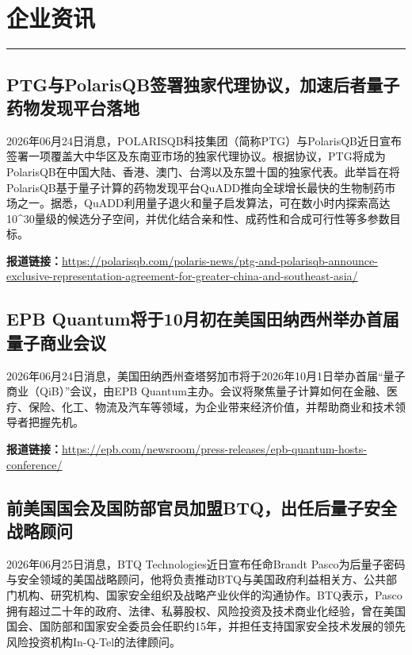 \documentclass[12pt,a4paper]{ctexart}
\begin{document}
\section{企业资讯}
\vspace{-0.5em}
\noindent\rule{\linewidth}{1.5pt}

\subsection{ PTG与PolarisQB签署独家代理协议，加速后者量子药物发现平台落地 }

2026年06月24日消息，POLARISQB科技集团（简称PTG）与PolarisQB近日宣布签署一项覆盖大中华区及东南亚市场的独家代理协议。根据协议，PTG将成为PolarisQB在中国大陆、香港、澳门、台湾以及东盟十国的独家代表。此举旨在将PolarisQB基于量子计算的药物发现平台QuADD推向全球增长最快的生物制药市场之一。据悉，QuADD利用量子退火和量子启发算法，可在数小时内探索高达10\textasciicircum{}30量级的候选分子空间，并优化结合亲和性、成药性和合成可行性等多参数目标。

\noindent\textbf{报道链接：}\url{https://polarisqb.com/polaris-news/ptg-and-polarisqb-announce-exclusive-representation-agreement-for-greater-china-and-southeast-asia/}

\subsection{ EPB Quantum将于10月初在美国田纳西州举办首届量子商业会议 }

2026年06月24日消息，美国田纳西州查塔努加市将于2026年10月1日举办首届“量子商业（QiB）”会议，由EPB Quantum主办。会议将聚焦量子计算如何在金融、医疗、保险、化工、物流及汽车等领域，为企业带来经济价值，并帮助商业和技术领导者把握先机。

\noindent\textbf{报道链接：}\url{https://epb.com/newsroom/press-releases/epb-quantum-hosts-conference/}

\subsection{ 前美国国会及国防部官员加盟BTQ，出任后量子安全战略顾问 }

2026年06月25日消息，BTQ Technologies近日宣布任命Brandt Pasco为后量子密码与安全领域的美国战略顾问，他将负责推动BTQ与美国政府利益相关方、公共部门机构、研究机构、国家安全组织及战略产业伙伴的沟通协作。BTQ表示，Pasco拥有超过二十年的政府、法律、私募股权、风险投资及技术商业化经验，曾在美国国会、国防部和国家安全委员会任职约15年，并担任支持国家安全技术发展的领先风险投资机构In-Q-Tel的法律顾问。
\end{document}
